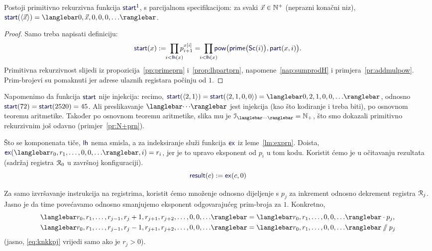 \begin{lema}\label{lm:startprn}
    Postoji primitivno rekurzivna funkcija $\f{start}^1$\!, s parcijalnom specifikacijom: za svaki $\vec x\in{\mathbb N}^+$\! (neprazni konačni niz), $\f{start}(\langle\vec x\rangle)=\knk{0,\vec x,0,0,0,\dotsc}$.
\end{lema}
\begin{proof}
Samo treba napisati definiciju:
\begin{equation}
    \f{start}(x):=\;\prod_{\mathclap{i<\f{lh}(x)}}p_{i+1}^{x[i]}=\;\prod_{\mathclap{i<\f{lh}(x)}}\f{pow}\bigl(\f{prime}\bigl(\f{Sc}(i)\bigr),\f{part}(x,i)\bigr)\text.
\end{equation}
Primitivna rekurzivnost slijedi iz propozicija~\ref{pp:primeprn} i~\ref{prop:lhpartprn}, napomene~\ref{nap:sumprodH} i primjera~\ref{pr:addmulpow}. Prim-brojevi su pomaknuti jer adrese ulaznih registara počinju od $1$.
\end{proof}

Napomenimo da funkcija $\f{start}$ nije injekcija: recimo, $\f{start}(\langle2,1\rangle)=\f{start}(\langle2,1,0,0\rangle)=\knk{0,2,1,0,0,\dotsc}$, odnosno $\f{start}(72)=\f{start}(2520)=45$. Ali preslikavanje $\knk{\cdots}$ jest injekcija (kao što kodiranje i treba biti), po osnovnom teoremu aritmetike. Također po osnovnom teoremu aritmetike, slika mu je $\im{\knk{\cdots}}=\N_+$, što smo dokazali primitivno rekurzivnim još odavno (primjer~\ref{pr:N+prn}).

Što se komponenata tiče, $\f{lh}$ nema smisla, a za indeksiranje služi funkcija $\f{ex}$ iz leme~\ref{lm:exprn}. Doista, $\f{ex}(\knk{r_0,r_1,\dotsc,0,0,\dotsc},i)=r_i$, jer je to upravo eksponent od $p_i$ u tom kodu. Koristit ćemo je u očitavanju rezultata (sadržaj registra $\mathcal R_{0}$ u završnoj konfiguraciji).
\begin{equation}\label{eq:resultdef}
    \f{result}(c):=\f{ex}(c,0)
\end{equation}

Za samo izvršavanje instrukcija na registrima, koristit ćemo množenje odnosno dijeljenje s $p_j$ za inkrement odnosno dekrement registra $\mathcal R_{j}$. Jasno je da time povećavamo odnosno smanjujemo eksponent odgovarajućeg prim-broja za $1$. Konkretno,
\begin{align}
\label{eq:knkppj}\knk{r_0,r_1,\dotsc,r_{j-1},r_j+1,r_{j+1},r_{j+2},\dotsc,0,0,\dotsc}
&=
\knk{r_0,r_1,\dotsc,0,0,\dotsc}\cdot p_j\text,
\\%
\label{eq:knkkpj}\knk{r_0,r_1,\dotsc,r_{j-1},r_j-1,r_{j+1},r_{j+2},\dotsc,0,0,\dotsc}
&=
\knk{r_0,r_1,\dotsc,0,0,\dotsc}\sslash p_j
\end{align}
(jasno, \eqref{eq:knkkpj} vrijedi samo ako je $r_j>0$).


